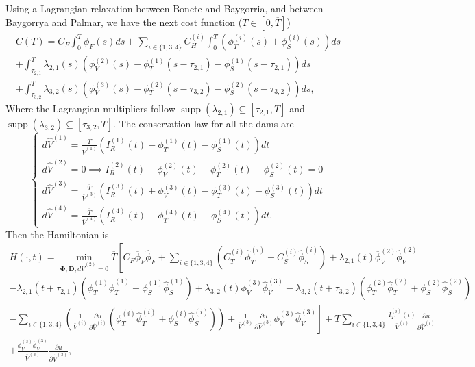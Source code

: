 \documentclass[12pt]{article}
\theoremstyle{definition}
\theoremstyle{remark}
\DeclareMathOperator{\supp}{supp}
\begin{document}
Using a Lagrangian relaxation between Bonete and Baygorria, and between Baygorrya and Palmar, we have the next cost function ($T\in[0,\overline{T}]$)
\begin{multline*}
C(T)=C_F\int_0^T\phi_F(s)ds+\sum_{i\in\{1,3,4\}}C_H^{(i)}\int_0^T\left(\phi_T^{(i)}(s)+\phi_S^{(i)}(s)\right)ds\\
+\int_{\tau_{2,1}}^T\lambda_{2,1}(s)\left(\phi_
V^{(2)}(s)-\phi_T^{(1)}(s-\tau_{2,1})-\phi_S^{(1)}(s-\tau_{2,1})\right)ds\\
+\int_{\tau_{3,2}}^T\lambda_{3,2}(s)\left(\phi_
V^{(3)}(s)-\phi_T^{(2)}(s-\tau_{3,2})-\phi_S^{(2)}(s-\tau_{3,2})\right)ds,
\end{multline*}
Where the Lagrangian multipliers follow $\supp(\lambda_{2,1})\subseteq[\tau_{2,1},T]$ and $\supp(\lambda_{3,2})\subseteq[\tau_{3,2},T]$. The conservation law for all the dams are
\begin{equation*}
\begin{cases}
d\hat{V}^{(1)}=\frac{\overline{T}}{\overline{V}^{(1)}}\left(I_R^{(1)}(t)-\phi_T^{(1)}(t)-\phi_S^{(1)}(t)\right)dt\\
d\hat{V}^{(2)}=0\implies I_R^{(2)}(t)+\phi_V^{(2)}(t)-\phi_T^{(2)}(t)-\phi_S^{(2)}(t)=0\\
d\hat{V}^{(3)}=\frac{\overline{T}}{\overline{V}^{(3)}}\left(I_R^{(3)}(t)+\phi_V^{(3)}(t)-\phi_T^{(3)}(t)-\phi_S^{(3)}(t)\right)dt\\
d\hat{V}^{(4)}=\frac{\overline{T}}{\overline{V}^{(4)}}\left(I_R^{(4)}(t)-\phi_T^{(4)}(t)-\phi_S^{(4)}(t)\right)dt.
\end{cases}
\end{equation*}
Then the Hamiltonian is
\begin{multline*}
H(\cdot,t)=\min_{\bm{\Phi},\bm{D},d\hat{V}^{(2)}=0}\overline{T}\left[C_F\overline{\phi}_F\hat{\phi}_F+\sum_{i\in\{1,3,4\}}\left(C_T^{(i)}\hat{\phi}_T^{(i)}+C_S^{(i)}\hat{\phi}_S^{(i)}\right)+\lambda_{2,1}(t)\overline{\phi}_V^{(2)}\hat{\phi}_V^{(2)}\right.\\
-\lambda_{2,1}(t+\tau_{2,1})\left(\overline{\phi}_T^{(1)}\hat{\phi}_T^{(1)}+\overline{\phi}_S^{(1)}\hat{\phi}_S^{(1)}\right)+\lambda_{3,2}(t)\overline{\phi}_V^{(3)}\hat{\phi}_V^{(3)}-\lambda_{3,2}(t+\tau_{3,2})\left(\overline{\phi}_T^{(2)}\hat{\phi}_T^{(2)}+\overline{\phi}_S^{(2)}\hat{\phi}_S^{(2)}\right)\\
\left.-\sum_{i\in\{1,3,4\}}\left(\frac{1}{\overline{V}^{(i)}}\frac{\partial u}{\partial\hat{V}^{(i)}}\left(\overline{\phi}_T^{(i)}\hat{\phi}_T^{(i)}+\overline{\phi}_S^{(i)}\hat{\phi}_S^{(i)}\right)\right)+\frac{1}{\overline{V}^{(3)}}\frac{\partial u}{\partial\hat{V}^{(3)}}\overline{\phi}_V^{(3)}\hat{\phi}_V^{(3)}\right]+\overline{T}\sum_{i\in\{1,3,4\}}\frac{I_T^{(i)}(t)}{\overline{V}^{(i)}}\frac{\partial u}{\partial\hat{V}^{(i)}}\\
+\frac{\overline{\phi}_V^{(3)}\hat{\phi}_V^{(3)}}{\overline{V}^{(3)}}\frac{\partial u}{\partial\hat{V}^{(3)}},
\end{multline*}
\end{document}
